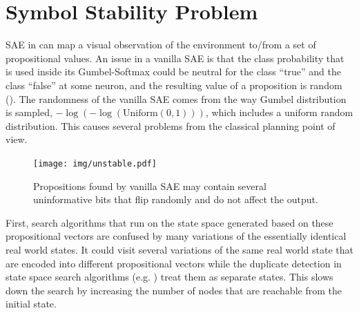 

\section{Symbol Stability Problem}
\label{issues}

SAE in \latentplanner can map a visual observation of the environment to/from a set of propositional values.
An issue in a vanilla SAE is that the class probability that is used inside its Gumbel-Softmax could be
neutral for the class ``true'' and the class ``false'' at some neuron, and the resulting value
of a proposition is random ().
The randomness of the vanilla SAE comes from the way
Gumbel distribution is sampled, $-\log (-\log (\text{Uniform}(0,1)))$, which includes
a uniform random distribution.
This causes several problems from the classical planning point of view.

\begin{figure}[htb]
 \centering
 \texttt{[image: img/unstable.pdf]}
 \caption{Propositions found by vanilla SAE may contain several uninformative bits
 that flip randomly and do not affect the output.}
 \label{unstable}
\end{figure}

First, search algorithms that run on the state space generated based on these propositional vectors
are confused by many variations of the essentially identical real world states.
It could visit several variations of the same real world state that are encoded into different propositional vectors
while the duplicate detection in state space search algorithms (e.g. \astar) treat them as separate states.
This slows down the search by increasing the number of nodes that are reachable from the initial state.

